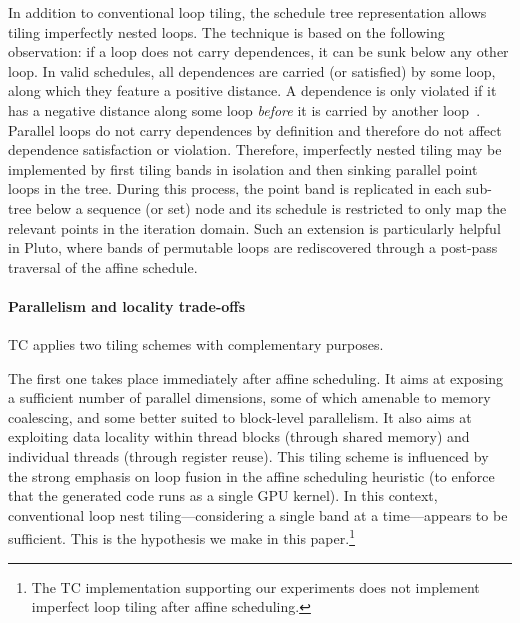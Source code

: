 In addition to conventional loop tiling, the schedule tree representation
allows tiling imperfectly nested loops.
The technique is based on the following observation: if a loop does not carry
dependences, it can be sunk below any other loop.
In valid schedules, all dependences are carried (or satisfied) by some loop,
along which they feature a positive distance.
A dependence is only violated if it has a negative distance along some loop
\emph{before} it is carried by another loop~\cite{KennedyAllen2002compilers}.
Parallel loops do not carry dependences by definition and therefore do not
affect dependence satisfaction or violation.
Therefore, imperfectly nested tiling may be implemented by first tiling bands
in isolation and then sinking parallel point loops in the tree.
During this process, the point band is replicated in each sub-tree below a
sequence (or set) node and its schedule is restricted to only map
the relevant points in the iteration domain. Such an extension is particularly
helpful in Pluto, where bands of permutable loops are rediscovered through a
post-pass traversal of the affine schedule.

\paragraph{Parallelism and locality trade-offs}
TC applies two tiling schemes with complementary purposes.

The first one takes place immediately after affine scheduling. It aims
at exposing a sufficient number of parallel dimensions, some of which
amenable to memory coalescing, and some better suited to block-level
parallelism. It also aims at exploiting data locality within thread
blocks (through shared memory) and individual threads (through
register reuse). This tiling scheme is influenced by the
strong emphasis on loop fusion in the affine scheduling heuristic (to
enforce that the generated code runs as a single GPU kernel). In this
context, conventional loop nest tiling---considering a single band at
a time---appears to be sufficient. This is the
hypothesis we make in this paper.\footnote{The TC implementation
  supporting our experiments does not implement imperfect loop tiling
  after affine scheduling.}

